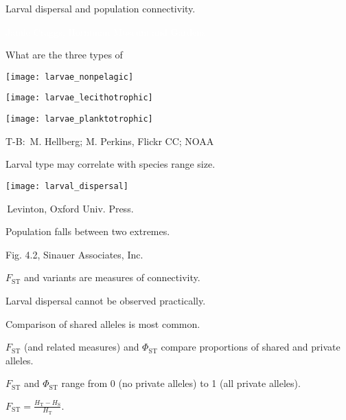 \documentclass[t]{beamer}
\begin{document}



{
\begin{frame}[b]{Larval dispersal and population connectivity.}

	\hfill \tiny \textcolor{white}{Jamie Craggs, Horniman Museum and Gardens.}
\end{frame}
}
%
\begin{frame}[t]{What are the three types of }
	\begin{multicols}{2}

	\begin{center}
		\texttt{[image: larvae\_nonpelagic]}
		
		\texttt{[image: larvae\_lecithotrophic]}

		\texttt{[image: larvae\_planktotrophic]}
	\end{center}	
	\columnbreak

	
	\end{multicols}
	
	\vfilll
	
	\tiny T-B: \textcopyright\,M. Hellberg; M. Perkins, Flickr CC; NOAA
\end{frame}
%
\begin{frame}[t]{Larval type may correlate with species range size.}

\texttt{[image: larval\_dispersal]}

\vfilll

\tiny \textcopyright\,Levinton, Oxford Univ. Press.
\end{frame}
%
{
\begin{frame}[b]{Population  falls between two extremes.}

	\hfill \tiny Fig. 4.2, \textcopyright Sinauer Associates, Inc.
\end{frame}
}
%
\begin{frame}{$F_\mathrm{ST}$ and variants are measures of connectivity.}

	\hangpara Larval dispersal cannot be observed practically.

	\hangpara Comparison of shared alleles is most common.

	\hangpara $F_{\mathrm{ST}}$ (and related measures) and $\Phi_{\mathrm{ST}}$ compare proportions of shared and private alleles.

	\hangpara $F_{\mathrm{ST}}$ and $\Phi_{\mathrm{ST}}$ range from 0 (no private alleles) to 1 (all private alleles).

	\hangpara $F_{\mathrm{ST}} = \frac{H_\mathrm{T} - H_\mathrm{S}}{H_\mathrm{T}}.$
	

\end{frame}
\end{document}
